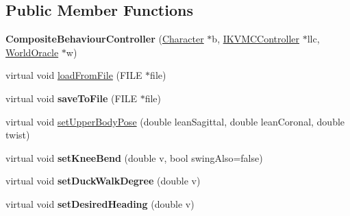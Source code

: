 \subsection*{Public Member Functions}
\begin{DoxyCompactItemize}
\item 
\hypertarget{classCartWheel_1_1Core_1_1CompositeBehaviourController_ad79400366bf2d4e638e36b8e4304c50b}{
{\bfseries CompositeBehaviourController} (\hyperlink{classCartWheel_1_1Core_1_1Character}{Character} $\ast$b, \hyperlink{classCartWheel_1_1Core_1_1IKVMCController}{IKVMCController} $\ast$llc, \hyperlink{classCartWheel_1_1Core_1_1WorldOracle}{WorldOracle} $\ast$w)}
\label{classCartWheel_1_1Core_1_1CompositeBehaviourController_ad79400366bf2d4e638e36b8e4304c50b}

\item 
virtual void \hyperlink{classCartWheel_1_1Core_1_1CompositeBehaviourController_ad001c87ff24b2e61b0ee4edb3cca5e3b}{loadFromFile} (FILE $\ast$file)
\item 
\hypertarget{classCartWheel_1_1Core_1_1CompositeBehaviourController_a1d9dcd5c45b95b88b76bdabba957d6c6}{
virtual void {\bfseries saveToFile} (FILE $\ast$file)}
\label{classCartWheel_1_1Core_1_1CompositeBehaviourController_a1d9dcd5c45b95b88b76bdabba957d6c6}

\item 
virtual void \hyperlink{classCartWheel_1_1Core_1_1CompositeBehaviourController_a0c01e07f056c9af2c59c354471859d29}{setUpperBodyPose} (double leanSagittal, double leanCoronal, double twist)
\item 
\hypertarget{classCartWheel_1_1Core_1_1CompositeBehaviourController_a0e04839270598d7f32dee19f0895a1c7}{
virtual void {\bfseries setKneeBend} (double v, bool swingAlso=false)}
\label{classCartWheel_1_1Core_1_1CompositeBehaviourController_a0e04839270598d7f32dee19f0895a1c7}

\item 
\hypertarget{classCartWheel_1_1Core_1_1CompositeBehaviourController_aa2f231214cfea4c92a598f502eaa6af9}{
virtual void {\bfseries setDuckWalkDegree} (double v)}
\label{classCartWheel_1_1Core_1_1CompositeBehaviourController_aa2f231214cfea4c92a598f502eaa6af9}

\item 
\hypertarget{classCartWheel_1_1Core_1_1CompositeBehaviourController_abbbcb997f4965ab59c15cc571e70a909}{
virtual void {\bfseries setDesiredHeading} (double v)}
\label{classCartWheel_1_1Core_1_1CompositeBehaviourController_abbbcb997f4965ab59c15cc571e70a909}


\end{DoxyCompactItemize}
